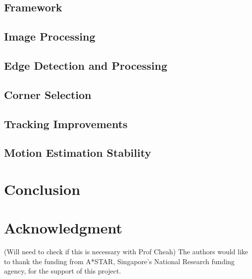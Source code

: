 \documentclass[journal]{IEEEtran}
\begin{document}
\subsection{Framework}
\label{sec:experiments_framework}


\subsection{Image Processing}
\label{sec:experiments_image_processing}


\subsection{Edge Detection and Processing}
\label{sec:experiments_edge_d_and_p}


\subsection{Corner Selection}
\label{sec:experiments_corner_selection}


\subsection{Tracking Improvements}
\label{sec:experiments_tracking_improvements}


\subsection{Motion Estimation Stability}
\label{sec:experiments_me_stability}


\section{Conclusion}
\label{sec:conclusion}


\section*{Acknowledgment}

(Will need to check if this is necessary with Prof Cheah)
The authors would like to thank the funding from A*STAR, Singapore's National Research funding agency, for the support of this project.



\end{document}
